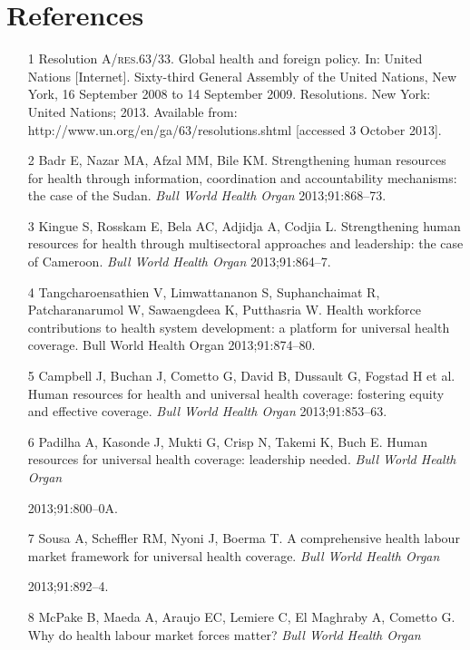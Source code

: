 \documentclass{article}
\begin{document}
\section*{References}
\begin{itemize}

\item[1] Resolution A/\textsc{res}.63/33. Global health and foreign policy. In: United
Nations
[Internet]. Sixty-third General Assembly of the United Nations, New York, 16
September 2008 to 14
September 2009. Resolutions. New York: United Nations; 2013. Available from:
http://www.un.org/en/ga/63/resolutions.shtml [accessed 3 October 2013].

\item[2] Badr E, Nazar MA, Afzal MM, Bile KM. Strengthening human resources for
health
through information, coordination and accountability mechanisms: the case of the
Sudan. \textit{Bull
World Health Organ}
2013;91:868–73.

\item[3] Kingue S, Rosskam E, Bela AC, Adjidja A, Codjia L. Strengthening human
resources for
health through multisectoral approaches and leadership: the case of Cameroon.
\textit{Bull World
Health Organ}
2013;91:864–7.

\item[4] Tangcharoensathien V, Limwattananon S, Suphanchaimat R, Patcharanarumol
W,
Sawaengdeea K, Putthasria W. Health workforce contributions to health system
development: a platform
for universal health coverage. Bull World Health Organ
2013;91:874–80.

\item[5] Campbell J, Buchan J, Cometto G, David B, Dussault G, Fogstad H et al.
Human
resources for health and universal health coverage: fostering equity and
effective coverage.
\textit{Bull World Health Organ}
2013;91:853–63.

\item[6] Padilha A, Kasonde J, Mukti G, Crisp N, Takemi K, Buch E. Human
resources for
universal health coverage: leadership needed. \textit{Bull World Health Organ}

2013;91:800–0A.

\item[7] Sousa A, Scheffler RM, Nyoni J, Boerma T. A comprehensive health labour
market
framework for universal health coverage. \textit{Bull World Health Organ}

2013;91:892–4.

\item[8] McPake B, Maeda A, Araujo EC, Lemiere C, El Maghraby A, Cometto G. Why
do health
labour market forces matter? \textit{Bull World Health Organ}


\end{itemize}
\end{document}
